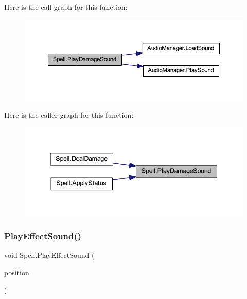 Here is the call graph for this function\+:
\nopagebreak
\begin{figure}[H]
\begin{center}
\leavevmode
\includegraphics[width=350pt]{class_spell_a80aa52e9ed4b3555bd04682d93bc5049_cgraph}
\end{center}
\end{figure}
Here is the caller graph for this function\+:
\nopagebreak
\begin{figure}[H]
\begin{center}
\leavevmode
\includegraphics[width=338pt]{class_spell_a80aa52e9ed4b3555bd04682d93bc5049_icgraph}
\end{center}
\end{figure}
\mbox{\label{class_spell_a1dfbc90153df551bd995b8b852f808f0}} 
\subsubsection{\texorpdfstring{PlayEffectSound()}{PlayEffectSound()}}
{\footnotesize\ttfamily void Spell.\+Play\+Effect\+Sound (\begin{DoxyParamCaption}\item[{Vector2\+Int}]{position }\end{DoxyParamCaption})}

